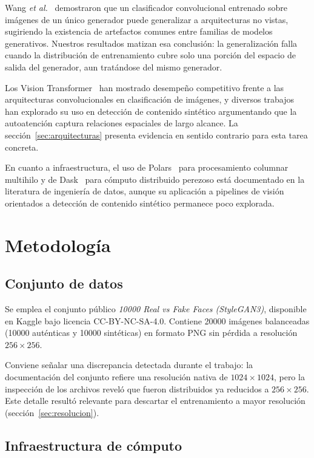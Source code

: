 \documentclass[10pt,twocolumn,letterpaper]{article}
\begin{document}
Wang \emph{et al.}~\cite{wang2020} demostraron que un clasificador
convolucional entrenado sobre imágenes de un único generador puede
generalizar a arquitecturas no vistas, sugiriendo la existencia de
artefactos comunes entre familias de modelos generativos. Nuestros
resultados matizan esa conclusión: la generalización falla cuando la
distribución de entrenamiento cubre solo una porción del espacio de salida
del generador, aun tratándose del mismo generador.

Los Vision Transformer~\cite{dosovitskiy2021} han mostrado desempeño
competitivo frente a las arquitecturas convolucionales en clasificación de
imágenes, y diversos trabajos han explorado su uso en detección de
contenido sintético argumentando que la autoatención captura relaciones
espaciales de largo alcance. La sección~\ref{sec:arquitecturas} presenta
evidencia en sentido contrario para esta tarea concreta.

En cuanto a infraestructura, el uso de Polars~\cite{polars} para
procesamiento columnar multihilo y de Dask~\cite{dask} para cómputo
distribuido perezoso está documentado en la literatura de ingeniería de
datos, aunque su aplicación a pipelines de visión orientados a detección de
contenido sintético permanece poco explorada.

\section{Metodología}

\subsection{Conjunto de datos}

Se emplea el conjunto público \emph{10000 Real vs Fake Faces (StyleGAN3)},
disponible en Kaggle bajo licencia CC-BY-NC-SA-4.0. Contiene
\num{20000} imágenes balanceadas (\num{10000} auténticas y \num{10000}
sintéticas) en formato PNG sin pérdida a resolución $256\times256$.

Conviene señalar una discrepancia detectada durante el trabajo: la
documentación del conjunto refiere una resolución nativa de
$1024\times1024$, pero la inspección de los archivos reveló que fueron
distribuidos ya reducidos a $256\times256$. Este detalle resultó relevante
para descartar el entrenamiento a mayor resolución
(sección~\ref{sec:resolucion}).

\subsection{Infraestructura de cómputo}
\end{document}
